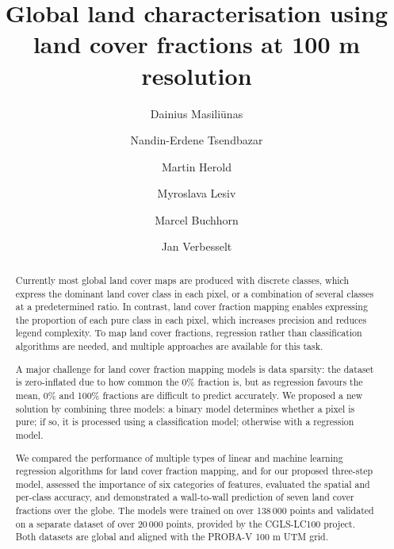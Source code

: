 \documentclass[review,authoryear,3p]{elsarticle}
\begin{document}
\begin{frontmatter} %

\title{Global land characterisation using land cover fractions at 100 m resolution}

\author[WURGRS]{Dainius Masiliūnas}

\author[WURGRS]{Nandin-Erdene Tsendbazar}

\author[WURGRS]{Martin Herold}

\author[IIASA]{Myroslava Lesiv}

\author[VITO]{Marcel Buchhorn}

\author[WURGRS]{Jan Verbesselt}

\address[WURGRS]{Wageningen University \& Research, Laboratory of Geo-Information Science and Remote Sensing, Droevendaalsesteeg 3, 6708 PB Wageningen, the Netherlands}
\address[IIASA]{International Institute for Applied Systems Analysis (IIASA), Schlossplatz 1, A-2361 Laxenburg, Austria}
\address[VITO]{Flemish Institute for Technological Research (VITO), Boeretang 200, BE-2400 Mol, Belgium}

\begin{abstract} %
Currently most global land cover maps are produced with discrete classes, which express the dominant land cover class in each pixel, or a combination of several classes at a predetermined ratio. In contrast, land cover fraction mapping enables expressing the proportion of each pure class in each pixel, which increases precision and reduces legend complexity. To map land cover fractions, regression rather than classification algorithms are needed, and multiple approaches are available for this task.

A major challenge for land cover fraction mapping models is data sparsity: the dataset is zero-inflated due to how common the 0\% fraction is, but as regression favours the mean, 0\% and 100\% fractions are difficult to predict accurately. We proposed a new solution by combining three models: a binary model determines whether a pixel is pure; if so, it is processed using a classification model; otherwise with a regression model.

We compared the performance of multiple types of linear and machine learning regression algorithms for land cover fraction mapping, and for our proposed three-step model, assessed the importance of six categories of features, evaluated the spatial and per-class accuracy, and demonstrated a wall-to-wall prediction of seven land cover fractions over the globe.
The models were trained on over 138\,000 points and validated on a separate dataset of over 20\,000 points, provided by the \gls{CGLS-LC100} project. Both datasets are global and aligned with the PROBA-V 100 m UTM grid.


\end{abstract}
\end{frontmatter}
\end{document}
